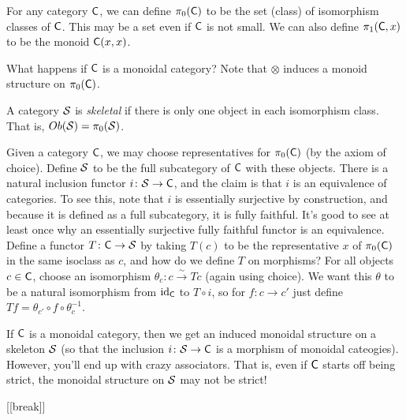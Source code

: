 For any category $\C$, we can define $\pi_0(\C)$ to be the set (class) of isomorphism classes of $\C$. This may be a set even if $\C$ is not small. We can also define $\pi_1(\C,x)$ to be the monoid $\C(x,x)$.

What happens if $\C$ is a monoidal category? Note that $\otimes$ induces a monoid structure on $\pi_0(\C)$.
\begin{definition}
 A category $\S$ is \emph{skeletal} if there is only one object in each isomorphism class. That is, $Ob(\S)=\pi_0(\S)$.
\end{definition}
Given a category $\C$, we may choose representatives for $\pi_0(\C)$ (by the axiom of choice). Define $\S$ to be the full subcategory of $\C$ with these objects. There is a natural inclusion functor $i\colon \S\to \C$, and the claim is that $i$ is an equivalence of categories. To see this, note that $i$ is essentially surjective by construction, and because it is defined as a full subcategory, it is fully faithful. It's good to see at least once why an essentially surjective fully faithful functor is an equivalence. Define a functor $T\colon \C\to \S$ by taking $T(c)$ to be the representative $x$ of $\pi_0(\C)$ in the same isoclass as $c$, and how do we define $T$ on morphisms? For all objects $c\in \C$, choose an isomorphism $\theta_c\colon c\xrightarrow\sim Tc$ (again using choice). We want this $\theta$ to be a natural isomorphism from $\id_\C$ to $T\circ i$, so for $f\colon c\to c'$ just define $Tf=\theta_{c'}\circ f\circ \theta_c^{-1}$.

If $\C$ is a monoidal category, then we get an induced monoidal structure on a skeleton $\S$ (so that the inclusion $i\colon \S\to \C$ is a morphism of monoidal cateogies). However, you'll end up with crazy associators. That is, even if $\C$ starts off being strict, the monoidal structure on $\S$ may not be strict!

[[break]]

